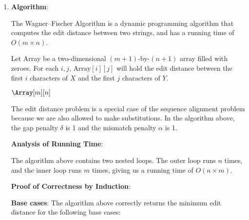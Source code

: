 \documentclass[a4paper, 10pt]{article}
\begin{document}
\begin{enumerate}
	\item \textbf{Algorithm}:

		The Wagner--Fischer Algorithm is a dynamic programming algorithm that
		computes the edit distance between two strings, and has a running time
		of $O(m \times n)$.

		Let Array be a two-dimensional $(m+1)$-by-$(n+1)$ array filled with
		zeroes. For each $i, j$, $\textrm{Array}[i][j]$ will hold the edit
		distance between the first $i$ characters of $X$ and the first $j$
		characters of $Y$.

		\begin{algorithm}[h]
			\BlankLine
			\BlankLine


			\Return $\Array[m][n]$
			\label{alg:prob2}
		\end{algorithm}

		The edit distance problem is a special case of the sequence alignment
		problem because we are also allowed to make substitutions. In the
		algorithm above, the gap penalty $\delta$ is 1 and the mismatch penalty
		$\alpha$ is 1.

		\textbf{Analysis of Running Time}:

		The algorithm above contains two nested loops. The outer loop runs $n$
		times, and the inner loop runs $m$ times, giving us a running time of
		$O(n \times m)$.

		\textbf{Proof of Correctness by Induction}:

		\textbf{Base cases}: The algorithm above correctly returns the minimum
		edit distance for the following base cases:


\end{enumerate}
\end{document}

